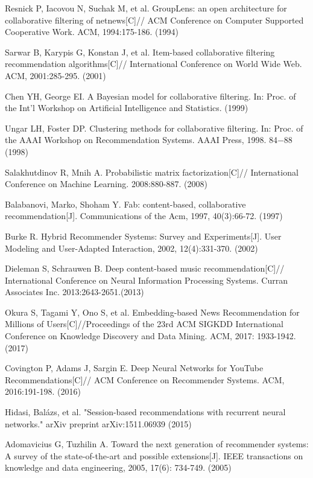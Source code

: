 \documentclass[runningheads]{llncs}
\begin{document}
\begin{thebibliography}{8}
 Resnick P, Iacovou N, Suchak M, et al. GroupLens: an open architecture for collaborative filtering of netnews[C]// ACM Conference on Computer Supported Cooperative Work. ACM, 1994:175-186. (1994)

 Sarwar B, Karypis G, Konstan J, et al. Item-based collaborative filtering recommendation algorithms[C]// International Conference on World Wide Web. ACM, 2001:285-295. (2001)

 Chen YH, George EI. A Bayesian model for collaborative filtering. In: Proc. of the Int’l Workshop on Artificial Intelligence and Statistics. (1999)

 Ungar LH, Foster DP. Clustering methods for collaborative filtering. In: Proc. of the AAAI Workshop on Recommendation
Systems. AAAI Press, 1998. 84−88 (1998)

 Salakhutdinov R, Mnih A. Probabilistic matrix factorization[C]// International Conference on Machine Learning. 2008:880-887. (2008)

 Balabanovi, Marko, Shoham Y. Fab: content-based, collaborative recommendation[J]. Communications of the Acm, 1997, 40(3):66-72. (1997)

 Burke R. Hybrid Recommender Systems: Survey and Experiments[J]. User Modeling and User-Adapted Interaction, 2002, 12(4):331-370. (2002)

 Dieleman S, Schrauwen B. Deep content-based music recommendation[C]// International Conference on Neural Information Processing Systems. Curran Associates Inc. 2013:2643-2651.(2013)

 Okura S, Tagami Y, Ono S, et al. Embedding-based News Recommendation for Millions of Users[C]//Proceedings of the 23rd ACM SIGKDD International Conference on Knowledge Discovery and Data Mining. ACM, 2017: 1933-1942. (2017)

 Covington P, Adams J, Sargin E. Deep Neural Networks for YouTube Recommendations[C]// ACM Conference on Recommender Systems. ACM, 2016:191-198. (2016)

 Hidasi, Balázs, et al. "Session-based recommendations with recurrent neural networks." arXiv preprint arXiv:1511.06939 (2015)

 Adomavicius G, Tuzhilin A. Toward the next generation of recommender systems: A survey of the state-of-the-art and possible extensions[J]. IEEE transactions on knowledge and data engineering, 2005, 17(6): 734-749. (2005)


\end{thebibliography}
\end{document}
